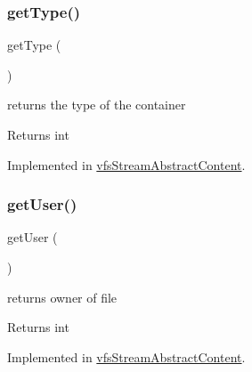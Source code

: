 \subsubsection{\texorpdfstring{get\+Type()}{getType()}}
{\footnotesize\ttfamily get\+Type (\begin{DoxyParamCaption}{ }\end{DoxyParamCaption})}

returns the type of the container

\begin{DoxyReturn}{Returns}
int 
\end{DoxyReturn}


Implemented in \mbox{\hyperlink{classorg_1_1bovigo_1_1vfs_1_1vfs_stream_abstract_content_a830b5c75df72b32396701bc563fbe3c7}{vfs\+Stream\+Abstract\+Content}}.

\mbox{\label{interfaceorg_1_1bovigo_1_1vfs_1_1vfs_stream_content_ae81b7186fb97a7c6457edcc68c9aa2ef}} 
\subsubsection{\texorpdfstring{get\+User()}{getUser()}}
{\footnotesize\ttfamily get\+User (\begin{DoxyParamCaption}{ }\end{DoxyParamCaption})}

returns owner of file

\begin{DoxyReturn}{Returns}
int 
\end{DoxyReturn}


Implemented in \mbox{\hyperlink{classorg_1_1bovigo_1_1vfs_1_1vfs_stream_abstract_content_ae81b7186fb97a7c6457edcc68c9aa2ef}{vfs\+Stream\+Abstract\+Content}}.

\mbox{\label{interfaceorg_1_1bovigo_1_1vfs_1_1vfs_stream_content_aa05f3a5ff79b553dfe46fd51006459e0}} 
